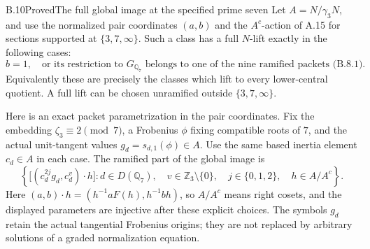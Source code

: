 \begin{statement}{B.10}{Proved}{The full global image at the specified prime seven}
Let $A=N/\gamma_3N$, and use the normalized pair coordinates
$(a,b)$ and the $A^c$-action of A.15 for sections supported
at $\{3,7,\infty\}$.  Such a class has a full $N$-lift
exactly in the following cases:
\[
 b=1,
 \quad\text{or its restriction to }G_{\mathbb Q_7}
       \text{ belongs to one of the nine ramified packets (B.8.1).}
                                                               \tag{B.10.1}
\]
Equivalently these are precisely the classes which lift to
every lower-central quotient.  A full lift can be chosen
unramified outside $\{3,7,\infty\}$.

Here is an exact packet parametrization in the pair
coordinates.  Fix the embedding $\zeta_3\equiv2\pmod7$,
a Frobenius $\phi$ fixing compatible roots of $7$, and the
actual unit-tangent values $g_d=s_{d,1}(\phi)\in A$.
Use the same based inertia element $c_d\in A$ in each case.
The ramified part of the global image is
\[
 \left\{
  \bigl[(c_d^{2j}g_d,c_d^v)\cdot h\bigr]:
    d\in D(\mathbb Q_7),\quad
    v\in\mathbb Z_3\setminus\{0\},\quad j\in\{0,1,2\},
    \quad h\in A/A^c
 \right\}.                                                   \tag{B.10.2}
\]
Here $(a,b)\cdot h=(h^{-1}aF(h),h^{-1}bh)$, so $A/A^c$
means right cosets, and the displayed parameters are
injective after these explicit choices.  The symbols
$g_d$ retain the actual tangential Frobenius origins;
they are not replaced by arbitrary solutions of a
graded normalization equation.
\end{statement}
